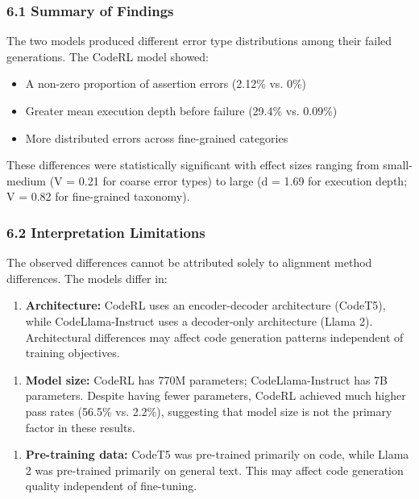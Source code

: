 
\subsubsection{6.1 Summary of Findings}

The two models produced different error type distributions among their failed generations. The CodeRL model showed:
\begin{itemize}
\item A non-zero proportion of assertion errors (2.12\% vs. 0\%)
\item Greater mean execution depth before failure (29.4\% vs. 0.09\%)
\item More distributed errors across fine-grained categories
\end{itemize}

These differences were statistically significant with effect sizes ranging from small-medium (V = 0.21 for coarse error types) to large (d = 1.69 for execution depth; V = 0.82 for fine-grained taxonomy).

\subsubsection{6.2 Interpretation Limitations}

The observed differences cannot be attributed solely to alignment method differences. The models differ in:

\begin{enumerate}
\item \textbf{Architecture:} CodeRL uses an encoder-decoder architecture (CodeT5), while CodeLlama-Instruct uses a decoder-only architecture (Llama 2). Architectural differences may affect code generation patterns independent of training objectives.
\end{enumerate}

\begin{enumerate}
\item \textbf{Model size:} CodeRL has 770M parameters; CodeLlama-Instruct has 7B parameters. Despite having fewer parameters, CodeRL achieved much higher pass rates (56.5\% vs. 2.2\%), suggesting that model size is not the primary factor in these results.
\end{enumerate}

\begin{enumerate}
\item \textbf{Pre-training data:} CodeT5 was pre-trained primarily on code, while Llama 2 was pre-trained primarily on general text. This may affect code generation quality independent of fine-tuning.
\end{enumerate}

